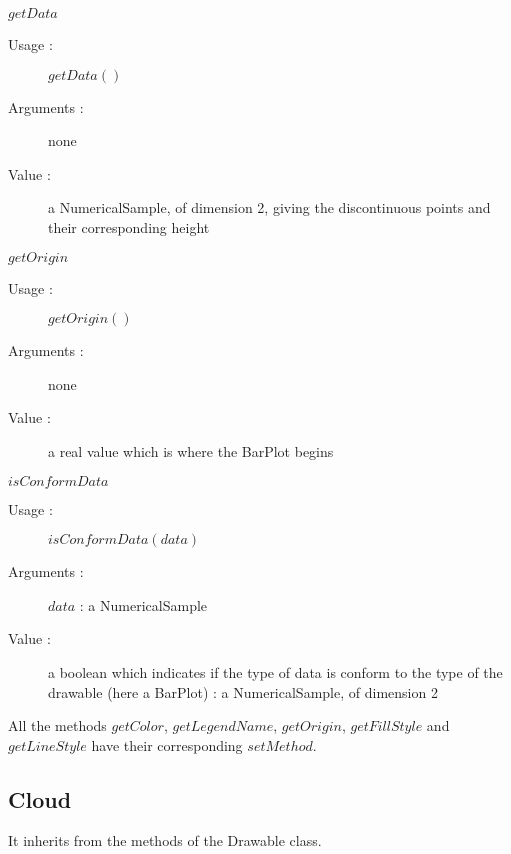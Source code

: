 \begin{description}
\begin{description}
  \item $getData$
    \begin{description}
    \item[Usage :] $getData()$
    \item[Arguments :] none
    \item[Value :] a NumericalSample, of dimension 2, giving the discontinuous points and their corresponding height
    \end{description}
    \bigskip
  \item $getOrigin$
    \begin{description}
    \item[Usage :] $getOrigin()$
    \item[Arguments :] none
    \item[Value :] a real value which is where the BarPlot begins
    \end{description}
    \bigskip
  \item $isConformData$
    \begin{description}
    \item[Usage :] $isConformData(data)$
    \item[Arguments :] $data$ : a NumericalSample
    \item[Value :] a boolean which indicates if the type of data is conform to the type of the drawable (here a BarPlot) : a NumericalSample, of dimension 2
    \end{description}
  \end{description}

  All the methods $getColor$,  $getLegendName$, $getOrigin$, $getFillStyle$  and $getLineStyle$ have their corresponding $setMethod$.

\end{description}



\newpage \subsection{Cloud}


It inherits from the methods of the Drawable class.

